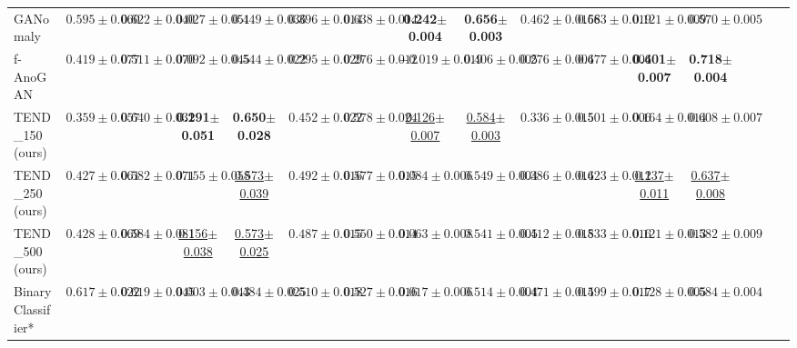 \documentclass[12pt]{spieman}  %
\begin{document}
\begin{spacing}{2}
\begin{table}[!tp]
{\begin{tabular}{|l|cccc|cccc|cccc|cccc|}
GANomaly~\cite{akcay2018ganomaly:akcay}         & {$0.595\pm0.060$}     & {$0.622\pm0.040$} & {$0.027\pm0.051$}   & {$0.449\pm0.036$} & {$0.396\pm0.014$}   & {$0.638\pm0.014$} & {\textbf{0.242$\pm$0.004}}  & {\textbf{0.656$\pm$0.003}} & {$0.462\pm0.0166$} & {$0.583\pm0.019$} & {$0.121\pm0.009$} & {$0.570\pm0.005$}\\
f-AnoGAN~\cite{schlegl2019f} & {$0.419\pm0.077$}   &{$0.511\pm0.070$}  & {$0.092\pm0.045$}    & {$0.544\pm0.022$} & {$0.295\pm0.029$}  & {$0.276\pm0.012$}  &  {$-0.019\pm0.019$}  & {$0.406\pm0.005$}  & {$0.276\pm0.004$} & {$0.677\pm0.006$} & {\textbf{0.401$\pm$0.007}}  & {\textbf{0.718$\pm$0.004}} \\
\hline
TEND\_150 (ours)    & {$0.359\pm0.057$}        & {$0.640\pm0.031$}  & {\textbf{0.291$\pm$0.051}}     & {\textbf{0.650$\pm$0.028}}  & {$0.452\pm0.022$}       & {$0.578\pm0.024$} & {\underline{0.126$\pm$0.007}}    & {\underline{0.584$\pm$0.003}}     & {$0.336\pm0.015$} & {$0.501\pm0.006$} & {$0.164\pm0.014$} & {$0.608\pm0.007$}\\
TEND\_250 (ours)    & {$0.427\pm0.061$}         & {$0.582\pm0.071$}     & {$0.155\pm0.058$}      & {\underline{0.573$\pm$0.039}}    & {$0.492\pm0.016$}        & {$0.577\pm0.015$}     & {$0.084\pm0.006$}     & {$0.549\pm0.004$}    & {$0.386\pm0.014$}  & {$0.623\pm0.011$}  & {\underline{0.237$\pm$0.011}}  & {\underline{0.637$\pm$0.008}}  \\ 
TEND\_500 (ours)    & {$0.428\pm0.069$}      & {$0.584\pm0.081$}   & {\underline{0.156$\pm$0.038}}      & {\underline{0.573$\pm$0.025}}   & {$0.487\pm0.015$}     &{$0.550\pm0.014$}   & {$0.063\pm0.008$} & {$0.541\pm0.005$}      & {$0.412\pm0.018$} & {$0.533\pm0.016$} & {$0.121\pm0.013$} & {$0.582\pm0.009$} \\ \hline
BinaryClassifier* & {$0.617\pm0.022$}        & {$0.619\pm0.045$}   & {$0.003\pm0.043$}     & {$0.484\pm0.025$}  & {$0.510\pm0.018$}      & {$0.527\pm0.016$}    & {$0.017\pm0.006$}   & {$0.514\pm0.004$}       & {$0.471\pm0.014$} & {$0.599\pm0.017$} & {$0.128\pm0.005$} & {$0.584\pm0.004$} \\  \hline
\end{tabular}%
}
\end{table}



\end{spacing}
\end{document}
